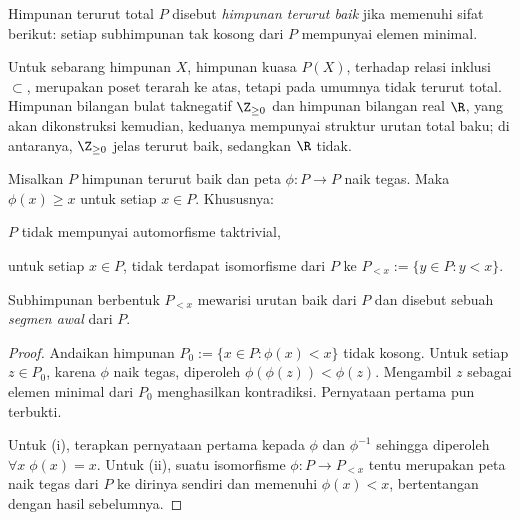 \begin{definition}[G.\ Cantor]\label{def:well-ordered}
	Himpunan terurut total $P$ disebut \emph{himpunan terurut baik} jika memenuhi sifat berikut: setiap subhimpunan tak kosong dari $P$ mempunyai elemen minimal.
\end{definition}

\begin{example}
	Untuk sebarang himpunan $X$, himpunan kuasa $P(X)$, terhadap relasi inklusi $\subset$, merupakan poset terarah ke atas, tetapi pada umumnya tidak terurut total. Himpunan bilangan bulat taknegatif $\Z_{\geq 0}$ dan himpunan bilangan real $\R$, yang akan dikonstruksi kemudian, keduanya mempunyai struktur urutan total baku; di antaranya, $\Z_{\geq 0}$ jelas terurut baik, sedangkan $\R$ tidak.
\end{example}

\begin{lemma}\label{prop:wellorder-automorphism}
	Misalkan $P$ himpunan terurut baik dan peta $\phi: P \to P$ naik tegas. Maka $\phi(x) \geq x$ untuk setiap $x \in P$. Khususnya:
	\begin{inparaenum}[(i)]
		\item $P$ tidak mempunyai automorfisme taktrivial,
		\item untuk setiap $x \in P$, tidak terdapat isomorfisme dari $P$ ke $P_{< x} := \{y \in P : y < x \}$.
	\end{inparaenum}
\end{lemma}
Subhimpunan berbentuk $P_{< x}$ mewarisi urutan baik dari $P$ dan disebut sebuah \emph{segmen awal} dari $P$.
\begin{proof}
	Andaikan himpunan $P_0 := \{x \in P : \phi(x) < x \}$ tidak kosong. Untuk setiap $z \in P_0$, karena $\phi$ naik tegas, diperoleh $\phi(\phi(z)) < \phi(z)$. Mengambil $z$ sebagai elemen minimal dari $P_0$ menghasilkan kontradiksi. Pernyataan pertama pun terbukti.

	Untuk (i), terapkan pernyataan pertama kepada $\phi$ dan $\phi^{-1}$ sehingga diperoleh $\forall x \; \phi(x)=x$. Untuk (ii), suatu isomorfisme $\phi: P \to P_{< x}$ tentu merupakan peta naik tegas dari $P$ ke dirinya sendiri dan memenuhi $\phi(x) < x$, bertentangan dengan hasil sebelumnya.
\end{proof}

